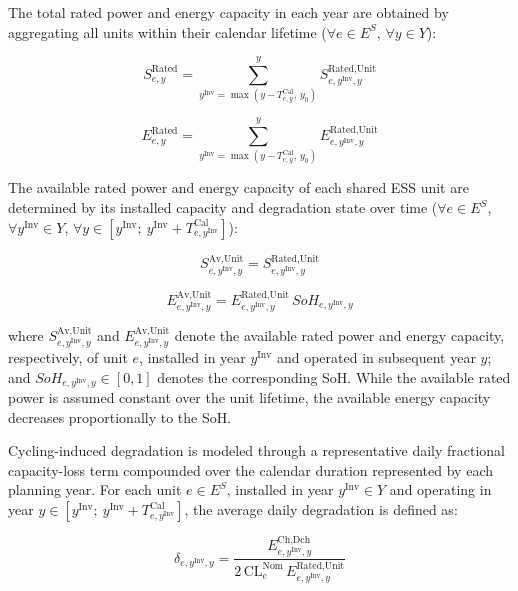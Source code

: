 \documentclass[preprint,12pt]{elsarticle}
\begin{document}
The total rated power and energy capacity in each year are obtained by aggregating all units within their calendar lifetime ($\forall e \in E^S$, $\forall y \in Y$):

\begin{equation}
    S^{\text{Rated}}_{e,y} = \sum_{y^\text{Inv}=\max(y-T^\text{Cal}_{e,y},\,y_0)}^{y} S^{\text{Rated,Unit}}_{e,y^\text{Inv},y}
\end{equation}

\begin{equation}
    E^{\text{Rated}}_{e,y} = \sum_{y^\text{Inv}=\max(y-T^\text{Cal}_{e,y},\,y_0)}^{y} E^{\text{Rated,Unit}}_{e,y^\text{Inv},y}
\end{equation}

The available rated power and energy capacity of each shared ESS unit are determined by its installed capacity and degradation state over time ($\forall e \in E^S$, $\forall y^\text{Inv} \in Y$, $\forall y \in [y^\text{Inv};~y^\text{Inv}+T^\text{Cal}_{e,y^\text{Inv}}]$):

\begin{equation}
    S^{\text{Av,Unit}}_{e,y^\text{Inv},y} = S^{\text{Rated,Unit}}_{e,y^\text{Inv},y}
\end{equation}

\begin{equation}
    E^{\text{Av,Unit}}_{e,y^\text{Inv},y} = E^{\text{Rated,Unit}}_{e,y^\text{Inv},y} \, SoH_{e,y^\text{Inv},y}
\end{equation}

\noindent
where 
$S^{\text{Av,Unit}}_{e,y^\text{Inv},y}$ and $E^{\text{Av,Unit}}_{e,y^\text{Inv},y}$ denote the available rated power and energy capacity, respectively, of unit $e$, installed in year $y^\text{Inv}$ and operated in subsequent year $y$; and 
$SoH_{e,y^\text{Inv},y} \in [0,1]$ denotes the corresponding SoH. 
While the available rated power is assumed constant over the unit lifetime, the available energy capacity decreases proportionally to the SoH.

Cycling-induced degradation is modeled through a representative daily fractional capacity-loss term compounded over the calendar duration represented by each planning year. For each unit $e \in E^S$, installed in year $y^\text{Inv} \in Y$ and operating in year $y \in [y^\text{Inv};~y^\text{Inv}+T^\text{Cal}_{e,y^\text{Inv}}]$, the average daily degradation is defined as:

\begin{equation}
    \delta_{e,y^\text{Inv},y} = 
    \frac{E^{\text{Ch,Dch}}_{e,y^\text{Inv},y}}
    {2 \, \mathrm{CL}^\text{Nom}_e \, E^{\text{Rated,Unit}}_{e,y^\text{Inv},y}}
\end{equation}
\end{document}
